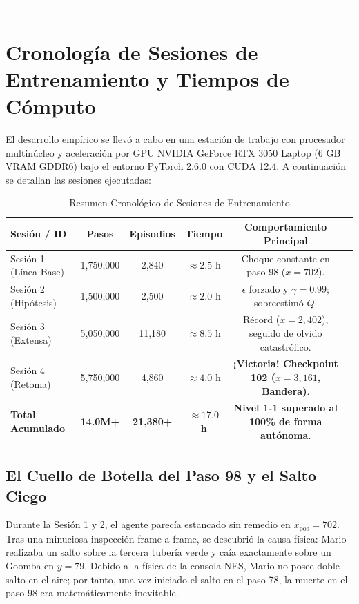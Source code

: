 \documentclass[11pt,letterpaper]{article}
\begin{document}
---

\section{Cronología de Sesiones de Entrenamiento y Tiempos de Cómputo}

El desarrollo empírico se llevó a cabo en una estación de trabajo con procesador multinúcleo y aceleración por GPU NVIDIA GeForce RTX 3050 Laptop (6 GB VRAM GDDR6) bajo el entorno PyTorch 2.6.0 con CUDA 12.4. A continuación se detallan las sesiones ejecutadas:

\begin{table}[H]
\centering
\small
\caption{Resumen Cronológico de Sesiones de Entrenamiento}
\label{tab:sesiones}
\begin{tabularx}{\textwidth}{p{3.2cm}ccccX}
\toprule
\textbf{Sesión / ID} & \textbf{Pasos} & \textbf{Episodios} & \textbf{Tiempo} & \textbf{Comportamiento Principal} \\
\midrule
Sesión 1 (Línea Base) & 1,750,000 & 2,840 & $\approx 2.5$ h & Choque constante en paso 98 ($x = 702$). \\
Sesión 2 (Hipótesis) & 1,500,000 & 2,500 & $\approx 2.0$ h & $\epsilon$ forzado y $\gamma = 0.99$; sobreestimó $Q$. \\
Sesión 3 (Extensa) & 5,050,000 & 11,180 & $\approx 8.5$ h & Récord ($x=2,402$), seguido de olvido catastrófico. \\
Sesión 4 (Retoma) & 5,750,000 & 4,860 & $\approx 4.0$ h & \textbf{¡Victoria! Checkpoint 102 ($x=3,161$, Bandera)}. \\
\midrule
\textbf{Total Acumulado} & \textbf{14.0M+} & \textbf{21,380+} & \textbf{$\approx 17.0$ h} & \textbf{Nivel 1-1 superado al 100\% de forma autónoma}. \\
\bottomrule
\end{tabularx}
\end{table}

\subsection{El Cuello de Botella del Paso 98 y el Salto Ciego}
Durante la Sesión 1 y 2, el agente parecía estancado sin remedio en $x_{\text{pos}} = 702$. Tras una minuciosa inspección frame a frame, se descubrió la causa física: Mario realizaba un salto sobre la tercera tubería verde y caía exactamente sobre un Goomba en $y=79$. Debido a la física de la consola NES, Mario no posee doble salto en el aire; por tanto, una vez iniciado el salto en el paso 78, la muerte en el paso 98 era matemáticamente inevitable. 
\end{document}

